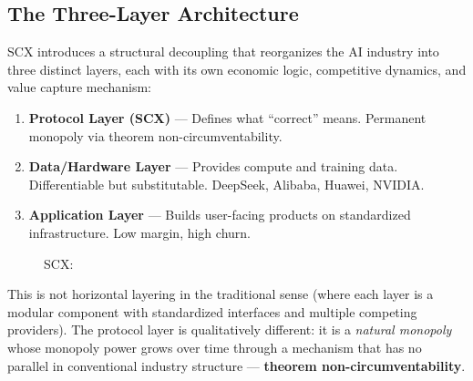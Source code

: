 \documentclass[12pt,a4paper]{article}
\theoremstyle{remark}
\newcommand{\SCX}{\textsf{SCX}}
\begin{document}
\subsection{The Three-Layer Architecture}
SCX introduces a structural decoupling that reorganizes the AI industry into three 
distinct layers, each with its own economic logic, competitive dynamics, and value 
capture mechanism:
\begin{enumerate}[label=\textbf{\arabic*}, leftmargin=*]
 \item \textbf{Protocol Layer (SCX)} --- Defines what ``correct'' means. 
 Permanent monopoly via theorem non-circumventability.
 \item \textbf{Data/Hardware Layer} --- Provides compute and training data. 
 Differentiable but substitutable. DeepSeek, Alibaba, Huawei, NVIDIA.
 \item \textbf{Application Layer} --- Builds user-facing products on standardized infrastructure. 
 Low margin, high churn.
\end{enumerate}
\begin{figure}[H]
\centering
{}
\caption{SCX:}
\label{fig:three_layer}
\end{figure}
This is not horizontal layering in the traditional sense (where each layer is a modular 
component with standardized interfaces and multiple competing providers). The protocol 
layer is qualitatively different: it is a \textit{natural monopoly} whose monopoly power 
grows over time through a mechanism that has no parallel in conventional industry 
structure --- \textbf{theorem non-circumventability}.
\end{document}
